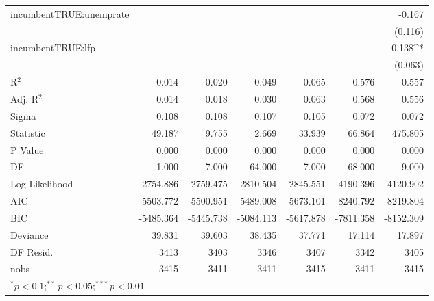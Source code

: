 \begin{table}[!htbp]
\begin{adjustbox}{width=\textwidth}
\begin{tabular}{l D{.}{.}{5.6} D{.}{.}{5.6} D{.}{.}{5.6} D{.}{.}{5.6} D{.}{.}{5.6} D{.}{.}{5.6}}
incumbentTRUE:unemprate & & & & & & -0.167 \\ & & & & & & (0.116) \\
incumbentTRUE:lfp & & & & & & -0.138^{*} \\ & & & & & & (0.063) \\
\midrule
R$^2$ & 0.014 & 0.020 & 0.049 & 0.065 & 0.576 & 0.557 \\
Adj. R$^2$ & 0.014 & 0.018 & 0.030 & 0.063 & 0.568 & 0.556 \\
Sigma & 0.108 & 0.108 & 0.107 & 0.105 & 0.072 & 0.072 \\
Statistic & 49.187 & 9.755 & 2.669 & 33.939 & 66.864 & 475.805 \\
P Value & 0.000 & 0.000 & 0.000 & 0.000 & 0.000 & 0.000 \\
DF & 1.000 & 7.000 & 64.000 & 7.000 & 68.000 & 9.000 \\
Log Likelihood & 2754.886 & 2759.475 & 2810.504 & 2845.551 & 4190.396 & 4120.902 \\
AIC & -5503.772 & -5500.951 & -5489.008 & -5673.101 & -8240.792 & -8219.804 \\
BIC & -5485.364 & -5445.738 & -5084.113 & -5617.878 & -7811.358 & -8152.309 \\
Deviance & 39.831 & 39.603 & 38.435 & 37.771 & 17.114 & 17.897 \\
DF Resid. & 3413 & 3403 & 3346 & 3407 & 3342 & 3405 \\
nobs & 3415 & 3411 & 3411 & 3415 & 3411 & 3415 \\
\bottomrule
{}
\end{tabular}
\end{adjustbox}

\label{table:coefficients}

\end{table}

